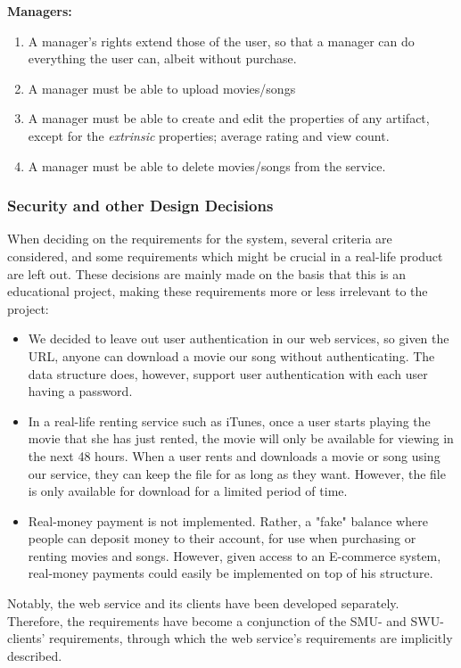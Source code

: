 \textbf{Managers:}
\begin{enumerate}
\setcounter{enumi}{\theenumTemp}
\item A manager's rights extend those of the user, so that a manager can do
	everything the user can, albeit without purchase.
\item A manager must be able to upload movies/songs
\item A manager must be able to create and edit the properties of any artifact,
	except for the \emph{extrinsic} properties; average rating and view
	count.
\item A manager must be able to delete movies/songs from the service.
\end{enumerate}

\subsubsection{Security and other Design Decisions}

When deciding on the
requirements for the system, several criteria are considered, and some
requirements which might be crucial in a real-life product are left out. These
decisions are mainly made on the basis that this is an educational project,
making these requirements more or less irrelevant to the project:
\begin{itemize}
\item We decided to leave out user authentication in our web services, so given
	the URL, anyone can download a movie our song without authenticating.
	The data structure does, however, support user authentication with each
	user having a password.
\item In a real-life renting service such as iTunes, once a user starts playing
	the movie that she has just rented, the movie will only be available
	for viewing in the next 48 hours. When a user rents and downloads a
	movie or song using our service, they can keep the file for as long as
	they want. However, the file is only available for download for a
	limited period of time.
\item Real-money payment is not implemented. Rather, a "fake" balance where
	people can deposit money to their account, for use when purchasing or
	renting movies and songs. However, given access to an E-commerce
	system, real-money payments could easily be implemented on top of his
	structure.
\end{itemize}

Notably, the web service and its clients have been developed separately.
Therefore, the requirements have become a conjunction of the SMU- and
SWU-clients' requirements, through which the web service's requirements are
implicitly described.

